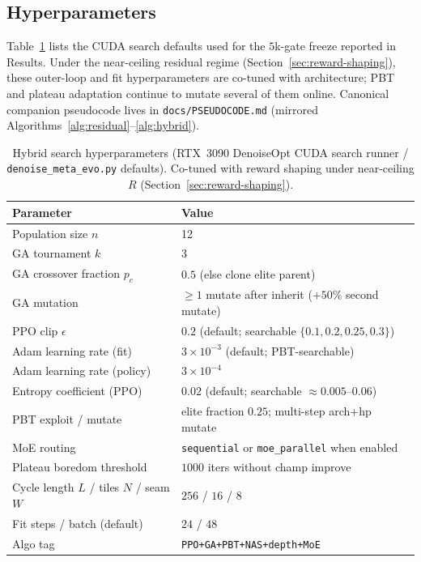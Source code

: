 \subsection{Hyperparameters}
\label{sec:hyperparams}

Table~\ref{tab:hyperparams} lists the CUDA search defaults used for the $5$k-gate freeze reported in Results.
Under the near-ceiling residual regime (Section~\ref{sec:reward-shaping}), these outer-loop and fit hyperparameters are co-tuned with architecture; PBT and plateau adaptation continue to mutate several of them online.
Canonical companion pseudocode lives in \texttt{docs/PSEUDOCODE.md} (mirrored Algorithms~\ref{alg:residual}--\ref{alg:hybrid}).

\begin{table}[t]
  \centering
  \small
  \caption{Hybrid search hyperparameters (RTX~3090 DenoiseOpt CUDA search runner / \texttt{denoise\_meta\_evo.py} defaults). Co-tuned with reward shaping under near-ceiling $R$ (Section~\ref{sec:reward-shaping}).}
  \label{tab:hyperparams}
  \setlength{\tabcolsep}{3pt}
  \begin{tabular}{@{}lp{}@{}}
    \toprule
    Parameter & Value \\
    \midrule
    Population size $n$ & 12 \\
    GA tournament $k$ & 3 \\
    GA crossover fraction $p_c$ & $0.5$ (else clone elite parent) \\
    GA mutation & $\ge 1$ mutate after inherit ($+50\%$ second mutate) \\
    PPO clip $\epsilon$ & $0.2$ (default; searchable $\{0.1,0.2,0.25,0.3\}$) \\
    Adam learning rate (fit) & $3{\times}10^{-3}$ (default; PBT-searchable) \\
    Adam learning rate (policy) & $3{\times}10^{-4}$ \\
    Entropy coefficient (PPO) & $0.02$ (default; searchable $\approx 0.005$--$0.06$) \\
    PBT exploit / mutate & elite fraction $0.25$; multi-step arch+hp mutate \\
    MoE routing & \texttt{sequential} or \texttt{moe\_parallel} when enabled \\
    Plateau boredom threshold & $1000$ iters without champ improve \\
    Cycle length $L$ / tiles $N$ / seam $W$ & $256$ / $16$ / $8$ \\
    Fit steps / batch (default) & $24$ / $48$ \\
    Algo tag & \texttt{PPO+GA+PBT+NAS+depth+MoE} \\
    \bottomrule
  \end{tabular}
\end{table}
